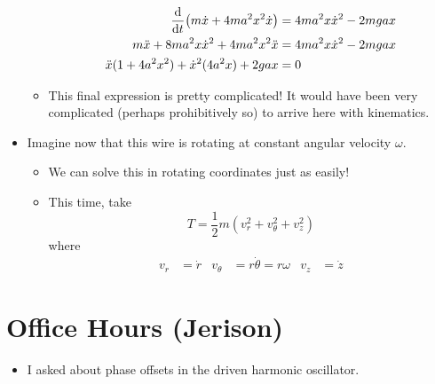 \documentclass[../notes.tex]{subfiles}
\begin{document}
\begin{itemize}
\begin{itemize}
\begin{align*}
            \dv{t}(m\dot{x}+4ma^2x^2\dot{x}) &= 4ma^2x\dot{x}^2-2mgax\\
            m\ddot{x}+8ma^2x\dot{x}^2+4ma^2x^2\ddot{x} &= 4ma^2x\dot{x}^2-2mgax\\
            \ddot{x}(1+4a^2x^2)+\dot{x}^2(4a^2x)+2gax &= 0
        \end{align*}
        \item This final expression is pretty complicated! It would have been very complicated (perhaps prohibitively so) to arrive here with kinematics.
    \end{itemize}
    \item Imagine now that this wire is rotating at constant angular velocity $\omega$.
    \begin{itemize}
        \item We can solve this in rotating coordinates just as easily!
        \item This time, take
        \begin{equation*}
            T = \frac{1}{2}m(v_r^2+v_\theta^2+v_z^2)
        \end{equation*}
        where
        \begin{align*}
            v_r &= \dot{r}&
            v_\theta &= r\dot{\theta} = r\omega&
            v_z &= \dot{z}
        \end{align*}
    \end{itemize}
\end{itemize}



\section{Office Hours (Jerison)}
\begin{itemize}
    \item I asked about phase offsets in the driven harmonic oscillator.
\end{itemize}
\end{document}
